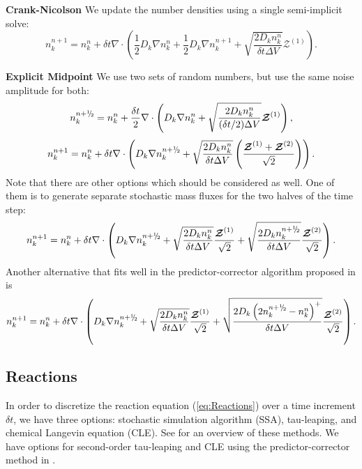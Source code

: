 \documentclass[final]{siamltex}
\def\mZb {\bm{\mathcal{Z}}}
\def\half   {\frac{1}{2}}
\def\myhalf {\sfrac{1}{2}}
\newcommand{\sfrac}[2]{\mathchoice
  {\kern0em\raise.5ex\hbox{\the\scriptfont0 #1}\kern-.15em/
   \kern-.15em\lower.25ex\hbox{\the\scriptfont0 #2}}
  {\kern0em\raise.5ex\hbox{\the\scriptfont0 #1}\kern-.15em/
   \kern-.15em\lower.25ex\hbox{\the\scriptfont0 #2}}
  {\kern0em\raise.5ex\hbox{\the\scriptscriptfont0 #1}\kern-.2em/
   \kern-.15em\lower.25ex\hbox{\the\scriptscriptfont0 #2}}
  {#1\!/#2}}
\begin{document}
{\bf Crank-Nicolson}
We update the number densities using a single semi-implicit solve:
\begin{equation}
n_k^{n+1} = n_k^n + \delta t\nabla\cdot\left(
\half D_k\nabla n_k^n + \half D_k\nabla n_k^{n+1}
+ \sqrt{\frac{2 D_k n_k^n}{\delta t\Delta V}}\mZb^{(1)}
\right).
\end{equation}

{\bf Explicit Midpoint}
We use two sets of random numbers, but use the same noise amplitude for both:
\begin{equation}
n_k^{n+\myhalf} = n_k^n + \frac{\delta t}{2} \nabla\cdot\left(D_k\nabla n_k^n
+ \sqrt{\frac{2 D_k n_k^n}{(\delta t/2)\Delta V}}\mZb^{(1)}\right),
\end{equation}
\begin{equation}
n_k^{n+1} = n_k^n + \delta t\nabla\cdot\left(
D_k\nabla n_k^{n+\myhalf}
+ \sqrt{\frac{2 D_k n_k^n}{\delta t\Delta V}}\left(\frac{\mZb^{(1)}+\mZb^{(2)}}{\sqrt{2}}\right)
\right).
\end{equation}
Note that there are other options which should be considered as well. One of them is to generate separate
stochastic mass fluxes for the two halves of the time step:
\begin{equation}
n_k^{n+1} = n_k^n + \delta t\nabla\cdot\left(
D_k\nabla n_k^{n+\myhalf}
+ \sqrt{\frac{2 D_k n_k^n}{\delta t\Delta V}} \frac{\mZb^{(1)}}{\sqrt{2}}
+ \sqrt{\frac{2 D_k n_k^{n+\myhalf}}{\delta t\Delta V}} \frac{\mZb^{(2)}}{\sqrt{2}}\right).
\end{equation}
Another alternative that fits well in the predictor-corrector algorithm proposed in \cite{AndersonMattingly2011}
is
\begin{equation}
n_k^{n+1} = n_k^n + \delta t\nabla\cdot\left(
D_k\nabla n_k^{n+\myhalf}
+ \sqrt{\frac{2 D_k n_k^n}{\delta t\Delta V}} \frac{\mZb^{(1)}}{\sqrt{2}}
+ \sqrt{\frac{2 D_k \left( 2 n_k^{n+\myhalf} - n_k^n \right)^+ }{\delta t\Delta V}} \frac{\mZb^{(2)}}{\sqrt{2}}\right).
\end{equation}

\subsection{Reactions}
In order to discretize the reaction equation (\ref{eq:Reactions}) over a time
increment $\delta t$, we have three options: stochastic
simulation algorithm (SSA), tau-leaping, and chemical Langevin equation (CLE).
See \cite{Gillespie2007} for an overview of these methods.  We have options
for second-order tau-leaping and CLE using the predictor-corrector
method in \cite{AndersonMattingly2011}.\\
\end{document}
